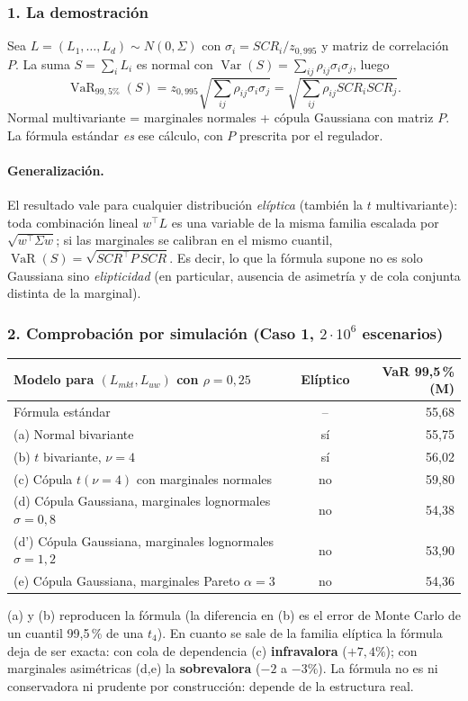 \documentclass[a4paper,12pt]{article}
\newcommand{\euro}{\texteuro}
\begin{document}
\subsubsection*{1. La demostración}
Sea $L=(L_1,\dots,L_d)\sim N(0,\Sigma)$ con $\sigma_i=SCR_i/z_{0{,}995}$ y matriz de correlación $P$. La suma $S=\sum_iL_i$ es normal con $\operatorname{Var}(S)=\sum_{ij}\rho_{ij}\sigma_i\sigma_j$, luego
\[
\operatorname{VaR}_{99{,}5\%}(S)=z_{0{,}995}\sqrt{\sum_{ij}\rho_{ij}\sigma_i\sigma_j}=\sqrt{\sum_{ij}\rho_{ij}SCR_iSCR_j}.
\]
Normal multivariante = marginales normales + cópula Gaussiana con matriz $P$. La fórmula estándar \emph{es} ese cálculo, con $P$ prescrita por el regulador.

\paragraph{Generalización.} El resultado vale para cualquier distribución \emph{elíptica} (también la $t$ multivariante): toda combinación lineal $w^\top L$ es una variable de la misma familia escalada por $\sqrt{w^\top\Sigma w}$; si las marginales se calibran en el mismo cuantil, $\operatorname{VaR}(S)=\sqrt{SCR^\top P\,SCR}$. Es decir, lo que la fórmula supone no es solo \guillemotleft{}Gaussiana\guillemotright{} sino \emph{elipticidad} (en particular, ausencia de asimetría y de cola conjunta distinta de la marginal).

\subsubsection*{2. Comprobación por simulación (Caso 1, $2\cdot10^6$ escenarios)}
\begin{center}
\small
\begin{tabular}{lcr}
\toprule
Modelo para $(L_{mkt},L_{uw})$ con $\rho=0{,}25$ & Elíptico & VaR 99,5\,\% (M\euro)\\
\midrule
Fórmula estándar & -- & 55,68\\
(a) Normal bivariante & sí & 55,75\\
(b) $t$ bivariante, $\nu=4$ & sí & 56,02\\
(c) Cópula $t(\nu=4)$ con marginales normales & no & 59,80\\
(d) Cópula Gaussiana, marginales lognormales $\sigma=0{,}8$ & no & 54,38\\
(d') Cópula Gaussiana, marginales lognormales $\sigma=1{,}2$ & no & 53,90\\
(e) Cópula Gaussiana, marginales Pareto $\alpha=3$ & no & 54,36\\
\bottomrule
\end{tabular}
\end{center}
(a) y (b) reproducen la fórmula (la diferencia en (b) es el error de Monte Carlo de un cuantil 99,5\,\% de una $t_4$). En cuanto se sale de la familia elíptica la fórmula deja de ser exacta: con cola de dependencia (c) \textbf{infravalora} ($+7{,}4\%$); con marginales asimétricas (d,e) la \textbf{sobrevalora} ($-2$ a $-3\%$). La fórmula no es ni conservadora ni prudente \guillemotleft{}por construcción\guillemotright{}: depende de la estructura real.
\end{document}
